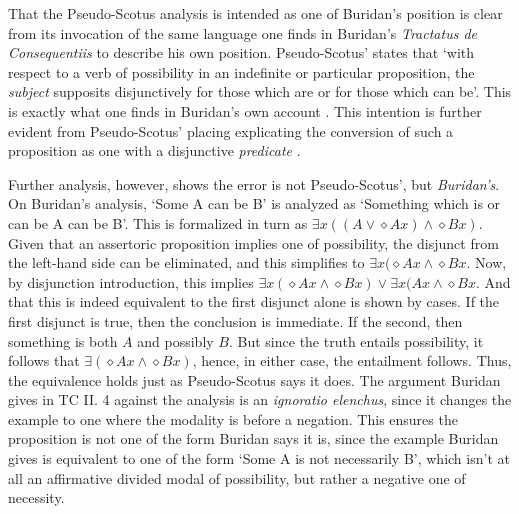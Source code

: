 \documentclass[]{article}
\begin{document}
That the Pseudo-Scotus analysis is intended as one of Buridan's position is clear from its invocation of the same language one finds in Buridan's \textit{Tractatus de Consequentiis} to describe his own position. Pseudo-Scotus' states that `with respect to a verb of possibility in an indefinite or particular proposition, the \textit{subject} supposits disjunctively for those which are or for those which can be'\cite[In anal. pr. I, q. 26, p. 143]{Pseudo-Scotus1891}. This is exactly what one finds in Buridan's own account \cite[TC II, 4, p. 97]{Buridan2015}. This intention is further evident from Pseudo-Scotus' placing explicating the conversion of such a proposition as one with a disjunctive \textit{predicate} \cite[In anal. pr. I, q. 26, p. 145]{Pseudo-Scotus1891}. 

Further analysis, however, shows the error is not Pseudo-Scotus', but \textit{Buridan's}. On Buridan's analysis, `Some A can be B' is analyzed as `Something which is or can be A can be B'. This is formalized in turn as $\exists x((A \vee \diamond Ax) \wedge \diamond Bx)$. Given that an assertoric proposition implies one of possibility, the disjunct from the left-hand side can be eliminated, and this simplifies to $\exists x(\diamond Ax \wedge \diamond Bx$. Now, by disjunction introduction, this implies $\exists x(\diamond Ax \wedge \diamond Bx) \vee \exists x(Ax \wedge \diamond Bx$. And that this is indeed equivalent to the first disjunct alone is shown by cases. If the first disjunct is true, then the conclusion is immediate. If the second, then something is both $A$ and possibly $B$. But since the truth entails possibility, it follows that $\exists(\diamond Ax \wedge \diamond Bx)$, hence, in either case, the entailment follows. Thus, the equivalence holds just as Pseudo-Scotus says it does. The argument Buridan gives in TC II. 4 against the analysis is an \textit{ignoratio elenchus}, since it changes the example to one where the modality is before a negation. This ensures the proposition is not one of the form Buridan says it is, since the example Buridan gives is equivalent to one of the form `Some A is not necessarily B', which isn't at all an affirmative divided modal of possibility, but rather a negative one of necessity.
\end{document}
